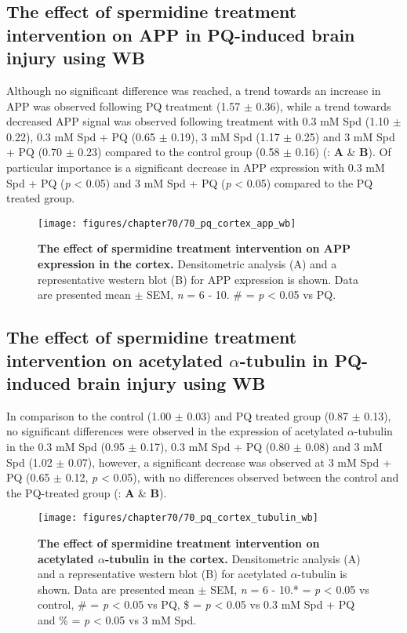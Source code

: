 \subsection{The effect of spermidine treatment intervention on APP in PQ-induced brain injury using WB}
Although no significant difference was reached, a trend towards an increase in APP was observed following PQ treatment (1.57 $\pm$ 0.36), while a trend towards decreased APP signal was observed following treatment with 0.3 mM Spd (1.10 $\pm$ 0.22), 0.3 mM Spd + PQ (0.65 $\pm$ 0.19), 3 mM Spd (1.17 $\pm$ 0.25) and 3 mM Spd + PQ (0.70 $\pm$ 0.23) compared to the control group (0.58 $\pm$ 0.16)  (: \textbf{A} \& \textbf{B}). Of particular importance is a significant decrease in APP expression with 0.3 mM Spd + PQ (\textit{p} < 0.05) and 3 mM Spd + PQ (\textit{p} < 0.05) compared to the PQ treated group. 

\begin{figure}[!htbp]
\center
  \texttt{[image: figures/chapter70/70\_pq\_cortex\_app\_wb]}
  \caption[The effect of spermidine treatment intervention on APP expression in the cortex]{\textbf{The effect of spermidine treatment intervention on APP expression in the cortex.} Densitometric analysis (A) and a representative western blot (B) for APP expression is shown. Data are presented  mean $\pm$ SEM, \textit{n} = 6 - 10. \# = \textit{p} < 0.05 vs PQ.}
  \label{fig:70_pq_cortex_app_wb}
\end{figure} 

\subsection{The effect of spermidine treatment intervention on acetylated $\alpha$-tubulin in PQ-induced brain injury using WB}
In comparison to the control (1.00 $\pm$ 0.03) and PQ treated group (0.87 $\pm$ 0.13), no significant differences were observed in the expression of acetylated $\alpha$-tubulin in the 0.3 mM Spd (0.95 $\pm$ 0.17), 0.3 mM Spd + PQ (0.80 $\pm$ 0.08) and 3 mM Spd (1.02 $\pm$ 0.07), however, a significant decrease was observed at 3 mM Spd + PQ (0.65 $\pm$ 0.12, \textit{p} < 0.05), with no differences observed between the control and the PQ-treated group (: \textbf{A} \& \textbf{B}). 

\begin{figure}[!htbp]
\center
  \texttt{[image: figures/chapter70/70\_pq\_cortex\_tubulin\_wb]}
  \caption[The effect of spermidine treatment intervention on acetylated $\alpha$-tubulin expression in the cortex]{\textbf{The effect of spermidine treatment intervention on acetylated $\alpha$-tubulin in the cortex.} Densitometric analysis (A) and a representative western blot (B) for acetylated $\alpha$-tubulin is shown. Data are presented  mean $\pm$ SEM, \textit{n} = 6 - 10.* = \textit{p} < 0.05 vs control, \# = \textit{p} < 0.05 vs PQ, \$ = \textit{p} < 0.05 vs 0.3 mM Spd + PQ and \% = \textit{p} < 0.05 vs 3 mM Spd.}
  \label{fig:70_pq_cortex_tubulin_wb}
\end{figure} 

